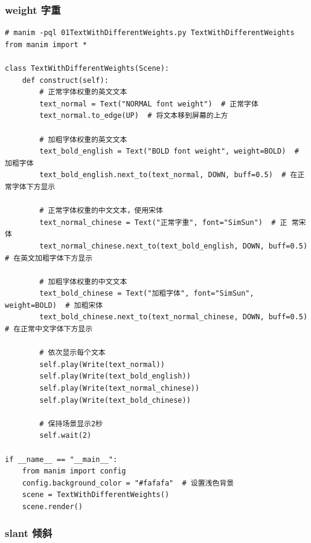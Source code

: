 \subsubsection{weight 字重}
\label{subsubsec:manim_text_formula_style_font_weight}
\begin{lstlisting}[style=pythonstyle]
# manim -pql 01TextWithDifferentWeights.py TextWithDifferentWeights
from manim import *

class TextWithDifferentWeights(Scene):
    def construct(self):
        # 正常字体权重的英文文本
        text_normal = Text("NORMAL font weight")  # 正常字体
        text_normal.to_edge(UP)  # 将文本移到屏幕的上方

        # 加粗字体权重的英文文本
        text_bold_english = Text("BOLD font weight", weight=BOLD)  # 加粗字体
        text_bold_english.next_to(text_normal, DOWN, buff=0.5)  # 在正常字体下方显示

        # 正常字体权重的中文文本，使用宋体
        text_normal_chinese = Text("正常字重", font="SimSun")  # 正 常宋体
        text_normal_chinese.next_to(text_bold_english, DOWN, buff=0.5)  # 在英文加粗字体下方显示

        # 加粗字体权重的中文文本
        text_bold_chinese = Text("加粗字体", font="SimSun", weight=BOLD)  # 加粗宋体
        text_bold_chinese.next_to(text_normal_chinese, DOWN, buff=0.5)  # 在正常中文字体下方显示

        # 依次显示每个文本
        self.play(Write(text_normal))
        self.play(Write(text_bold_english))
        self.play(Write(text_normal_chinese))
        self.play(Write(text_bold_chinese))

        # 保持场景显示2秒
        self.wait(2)

if __name__ == "__main__":
    from manim import config
    config.background_color = "#fafafa"  # 设置浅色背景
    scene = TextWithDifferentWeights()
    scene.render()
\end{lstlisting}       

\subsubsection{slant 倾斜}
\label{subsubsec:manim_text_formula_style_font_slant}

